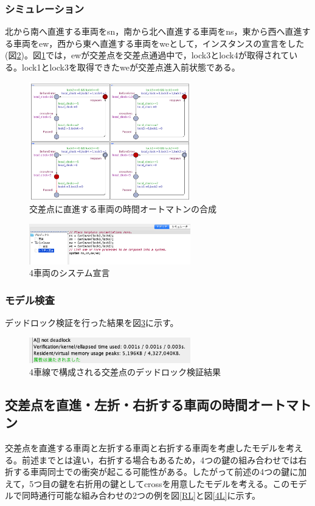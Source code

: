 \documentclass[twocolumn,10pt]{jsarticle}
\begin{document}
	\subsubsection{シミュレーション}
	北から南へ直進する車両をsn，南から北へ直進する車両をns，東から西へ直進する車両をew，西から東へ直進する車両をweとして，インスタンスの宣言をした(図\ref{newsSD})。図\ref{newsS}では，ewが交差点を交差点通過中で，lock3とlock4が取得されている。lock1とlock3を取得できたweが交差点進入前状態である。
	\begin{figure}[htbp]
	\centering
	\includegraphics[width=70mm]{newsSimu.png}
	\caption{交差点に直進する車両の時間オートマトンの合成}
	\label{newsS}
	\end{figure}
	\begin{figure}[htbp]
	\centering
	\includegraphics[width=70mm]{newsSD.png}
	\caption{4車両のシステム宣言}
	\label{newsSD}
	\end{figure}
	\subsubsection{モデル検査}
	デッドロック検証を行った結果を図\ref{newsV}に示す。
	\begin{figure}[htbp]
	\centering
	\includegraphics[width=70mm]{newsV.png}
	\caption{4車線で構成される交差点のデッドロック検証結果}
	\label{newsV}
	\end{figure}
	\subsection{交差点を直進・左折・右折する車両の時間オートマトン}
	交差点を直進する車両と左折する車両と右折する車両を考慮したモデルを考える。前述までとは違い，右折する場合もあるため，4つの鍵の組み合わせでは右折する車両同士での衝突が起こる可能性がある。したがって前述の4つの鍵に加えて，5つ目の鍵を右折用の鍵としてcrossを用意したモデルを考える。このモデルで同時通行可能な組み合わせの2つの例を図\ref{RL}と図\ref{4L}に示す。
\end{document}
